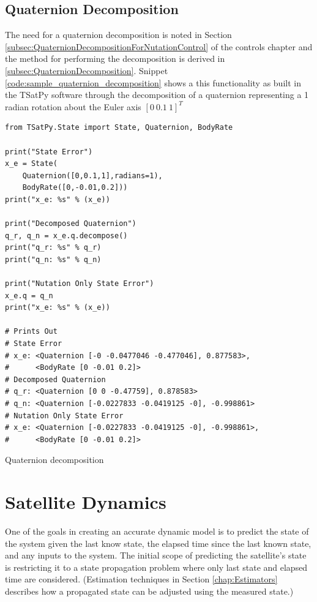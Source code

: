 \subsection{Quaternion Decomposition}
\label{subsec:TSatPyQuaternionDecomposition}

The need for a quaternion decomposition is noted in Section \ref{subsec:QuaternionDecompositionForNutationControl} of the controls chapter and the method for performing the decomposition is derived in \ref{subsec:QuaternionDecomposition}.  Snippet \ref{code:sample_quaternion_decomposition} shows a this functionality as built in the TSatPy software through the decomposition of a quaternion representing a 1 radian rotation about the Euler axis $[0 \ 0.1 \ 1]^T$

\begin{listing}[H]
\begin{singlespace}
  \begin{verbatim}
from TSatPy.State import State, Quaternion, BodyRate

print("State Error")
x_e = State(
    Quaternion([0,0.1,1],radians=1),
    BodyRate([0,-0.01,0.2]))
print("x_e: %s" % (x_e))

print("Decomposed Quaternion")
q_r, q_n = x_e.q.decompose()
print("q_r: %s" % q_r)
print("q_n: %s" % q_n)

print("Nutation Only State Error")
x_e.q = q_n
print("x_e: %s" % (x_e))

# Prints Out
# State Error
# x_e: <Quaternion [-0 -0.0477046 -0.477046], 0.877583>,
#      <BodyRate [0 -0.01 0.2]>
# Decomposed Quaternion
# q_r: <Quaternion [0 0 -0.47759], 0.878583>
# q_n: <Quaternion [-0.0227833 -0.0419125 -0], -0.998861>
# Nutation Only State Error
# x_e: <Quaternion [-0.0227833 -0.0419125 -0], -0.998861>,
#      <BodyRate [0 -0.01 0.2]>
  \end{verbatim}
\caption{Quaternion decomposition}
\label{code:sample_quaternion_decomposition}
\nocite{minted}
\end{singlespace}
\end{listing}




\section{Satellite Dynamics}
\label{sec:SatelliteDynamics}

One of the goals in creating an accurate dynamic model is to predict the state of the system given the last know state, the elapsed time since the last known state, and any inputs to the system.  The initial scope of predicting the satellite's state is restricting it to a state propagation problem where only last state and elapsed time are considered.  (Estimation techniques in Section \ref{chap:Estimators} describes how a propagated state can be adjusted using the measured state.)

